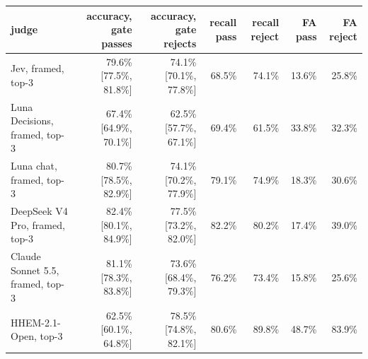 \begin{tabular}{lrrrrrr}
\toprule
judge & accuracy, gate passes & accuracy, gate rejects & recall pass & recall reject & FA pass & FA reject \\
\midrule
Jev, framed, top-3 & 79.6\% [77.5\%, 81.8\%] & 74.1\% [70.1\%, 77.8\%] & 68.5\% & 74.1\% & 13.6\% & 25.8\% \\
Luna Decisions, framed, top-3 & 67.4\% [64.9\%, 70.1\%] & 62.5\% [57.7\%, 67.1\%] & 69.4\% & 61.5\% & 33.8\% & 32.3\% \\
Luna chat, framed, top-3 & 80.7\% [78.5\%, 82.9\%] & 74.1\% [70.2\%, 77.9\%] & 79.1\% & 74.9\% & 18.3\% & 30.6\% \\
DeepSeek V4 Pro, framed, top-3 & 82.4\% [80.1\%, 84.9\%] & 77.5\% [73.2\%, 82.0\%] & 82.2\% & 80.2\% & 17.4\% & 39.0\% \\
Claude Sonnet 5.5, framed, top-3 & 81.1\% [78.3\%, 83.8\%] & 73.6\% [68.4\%, 79.3\%] & 76.2\% & 73.4\% & 15.8\% & 25.6\% \\
HHEM-2.1-Open, top-3 & 62.5\% [60.1\%, 64.8\%] & 78.5\% [74.8\%, 82.1\%] & 80.6\% & 89.8\% & 48.7\% & 83.9\% \\
\bottomrule
\end{tabular}
